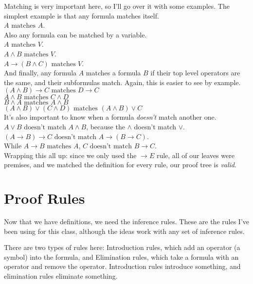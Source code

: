 \documentclass[12pt,a4paper]{article}
\def\land{\wedge}           %
\def\lor{\vee}              %
\begin{document}
\noindent
Matching is very important here, so I'll go over it with some examples.
The simplest example is that any formula matches itself.\\
$A \text{ matches } A$.\\

\noindent
Also any formula can be matched by a variable.\\
$A \text{ matches } V$.\\
$A \land B \text{ matches } V$.\\
$A \to (B \land C) \text{ matches } V$.\\

\noindent
And finally, any formula $A$ matches a formula $B$ if their top level operators are the same, and their subformulas match.
Again, this is easier to see by example.\\
$(A \land B) \to C \text{ matches } D \to C$\\
$A \land B \text{ matches } C \land D$\\
$B \land A \text{ matches } A \land B$\\
$(A \land B) \lor (C \land D) \text{ matches } (A \land B) \lor C$\\

\noindent
It's also important to know when a formula \textit{doesn't} match another one.\\
$A \lor B \text{ doesn't match } A \land B$, because the $\land$ doesn't match $\lor$.\\
$(A \to B) \to C \text{ doesn't match } A \to (B \to C)$.  \\
While $A\to B \text{ matches } A$, $C \text{ doesn't match } B \to C$.\\

\noindent
Wrapping this all up: since we only used the $\to E$ rule, 
all of our leaves were premises, and we matched the definition for every rule, our proof tree is \textit{valid}.

\section{Proof Rules}
Now that we have definitions, we need the inference rules.
These are the rules I've been using for this class, although the ideas work with any set of inference rules.

There are two types of rules here:
Introduction rules, which add an operator (a symbol) into the formula,
and Elimination rules, which take a formula with an operator and remove the operator.
Introduction rules introduce something, and elimination rules eliminate something.\\
 
\end{document}
